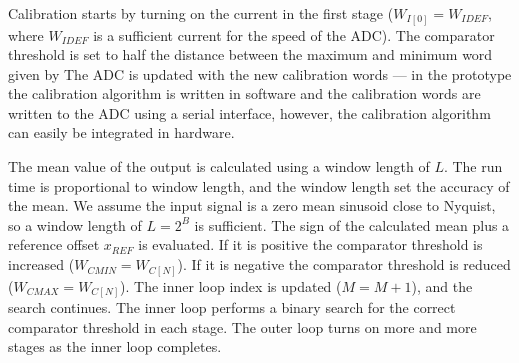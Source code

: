 Calibration starts by turning on the current in the first stage ($W_{I[0]}
= W_{IDEF}$, where $W_{IDEF}$ is a sufficient current for the speed of
the ADC). The comparator threshold is set to half the
distance between the maximum and minimum word given by
The ADC is updated with the new calibration words --- in the prototype the
calibration algorithm is written in software and the calibration
words are written to the ADC using a serial interface, however, the
calibration algorithm can easily be integrated in hardware. 

The mean value of the
output is calculated using a window length of $L$. The  run
time is proportional to window length, and the window length set the
accuracy of the mean. We assume the input signal is a zero mean sinusoid
close to Nyquist, so a window length of $L=2^B$ is sufficient. The
sign of the calculated mean plus a 
reference offset $x_{REF}$ is evaluated. If it is positive the
comparator threshold is increased ($W_{CMIN} =
W_{C[N]}$). If it is negative the comparator threshold is
reduced ($W_{CMAX} =
W_{C[N]}$). The inner loop index is updated ($M = M +1$), and the search
continues. The inner loop performs a binary search for the correct
comparator threshold in each stage. The outer loop turns on
more and more stages as the inner loop completes. 

